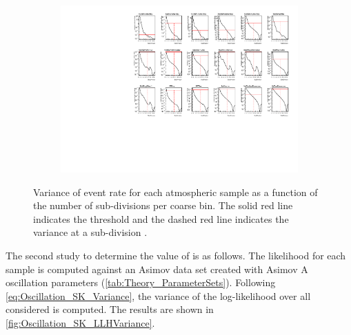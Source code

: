 \begin{figure}
  \begin{subfigure}[t]{\textwidth}
    \includegraphics[width=\textwidth, trim={0mm 0mm 0mm 0mm}, clip,page=1]{Figures/Oscillation/EventRate_VarianceGraphs.pdf}
  \end{subfigure}
  \caption{Variance of event rate for each atmospheric sample as a function of the number of sub-divisions per coarse bin. The solid red line indicates the  threshold and the dashed red line indicates the variance at a sub-division .}
  \label{fig:Oscillation_SK_EventRateVariance}
\end{figure}
  

The second study to determine the value of  is as follows. The likelihood for each sample is computed against an Asimov data set created with Asimov A oscillation parameters (\autoref{tab:Theory_ParameterSets}). Following \autoref{eq:Oscillation_SK_Variance}, the variance of the log-likelihood over all considered  is computed. The results are shown in \autoref{fig:Oscillation_SK_LLHVariance}. 

